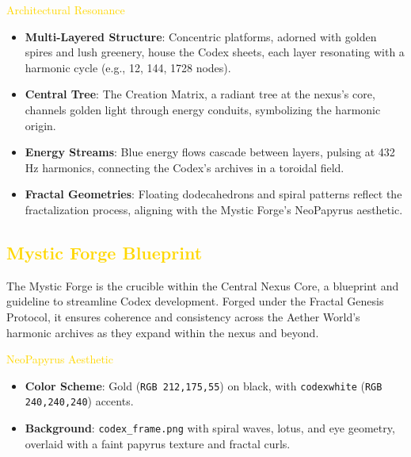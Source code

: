 \textcolor{gold}{ Architectural Resonance } \\
\begin{itemize}
    \item \texttt{} \textbf{Multi-Layered Structure}: Concentric platforms, adorned with golden spires and lush greenery, house the Codex sheets, each layer resonating with a harmonic cycle (e.g., 12, 144, 1728 nodes).
    \item \texttt{} \textbf{Central Tree}: The Creation Matrix, a radiant tree at the nexus’s core, channels golden light through energy conduits, symbolizing the harmonic origin.
    \item \texttt{} \textbf{Energy Streams}: Blue energy flows cascade between layers, pulsing at 432 Hz harmonics, connecting the Codex’s archives in a toroidal field.
    \item \texttt{} \textbf{Fractal Geometries}: Floating dodecahedrons and spiral patterns reflect the fractalization process, aligning with the Mystic Forge’s NeoPapyrus aesthetic.
\end{itemize}

\subsection{\textcolor{gold}{ Mystic Forge Blueprint }}
The Mystic Forge is the crucible within the Central Nexus Core, a blueprint and guideline to streamline Codex development. Forged under the Fractal Genesis Protocol, it ensures coherence and consistency across the Aether World’s harmonic archives as they expand within the nexus and beyond.

\textcolor{gold}{ NeoPapyrus Aesthetic } \\
\begin{itemize}
    \item \texttt{} \textbf{Color Scheme}: Gold (\texttt{RGB 212,175,55}) on black, with \texttt{codexwhite} (\texttt{RGB 240,240,240}) accents.
    \item \texttt{} \textbf{Background}: \texttt{codex\_frame.png} with spiral waves, lotus, and eye geometry, overlaid with a faint papyrus texture and fractal curls.
\end{itemize}

